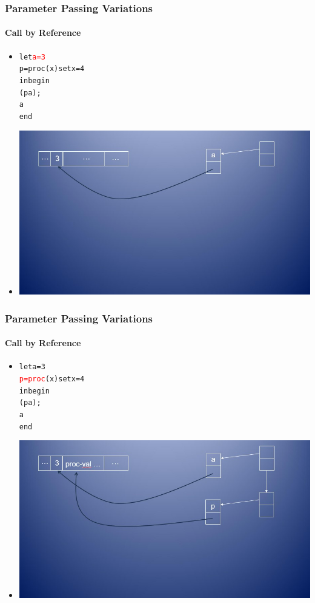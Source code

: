\documentclass{beamer}
\begin{document}
\begin{frame}[fragile]
\frametitle{Parameter Passing Variations}
\framesubtitle{Call by Reference}
\begin{scriptsize}
\begin{itemize}
\item<1->
\begin{alltt}
let \textcolor{red}{a = 3}
	p = proc (x) set x = 4
in begin
    (p a);
    a
   end
\end{alltt}

\item<1->
\begin{center}
  \includegraphics[scale=0.5]{cbr1.jpg}
\end{center}

\end{itemize}
\end{scriptsize}
\end{frame}

\begin{frame}[fragile]
\frametitle{Parameter Passing Variations}
\framesubtitle{Call by Reference}
\begin{scriptsize}
\begin{itemize}
\item<1->
\begin{alltt}
let a = 3
	\textcolor{red}{p = proc} (x) set x = 4
in begin
    (p a);
    a
   end
\end{alltt}

\item<1->
\begin{center}
  \includegraphics[scale=0.5]{cbr2.jpg}
\end{center}

\end{itemize}
\end{scriptsize}
\end{frame}
\end{document}
